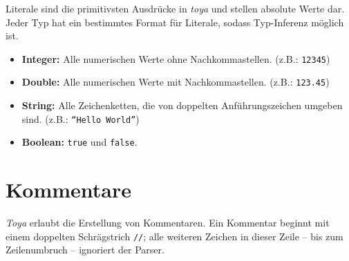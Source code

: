 Literale sind die primitivsten Ausdrücke in \textit{toya} und stellen absolute Werte dar. Jeder Typ hat ein bestimmtes Format für Literale, sodass Typ-Inferenz möglich ist. 

\begin{itemize}
    \item \textbf{Integer:} Alle numerischen Werte ohne Nachkommastellen. (z.B.: \texttt{12345})
    \item \textbf{Double:} Alle numerischen Werte mit Nachkommastellen. (z.B.: \texttt{123.45})
    \item \textbf{String:} Alle Zeichenketten, die von doppelten Anführungszeichen umgeben sind. (z.B.: \texttt{``Hello World''})
    \item \textbf{Boolean:} \texttt{true} und \texttt{false}. 
\end{itemize}

\section{Kommentare}

\textit{Toya} erlaubt die Erstellung von Kommentaren. Ein Kommentar beginnt mit einem doppelten Schrägstrich \texttt{//}; alle weiteren Zeichen in dieser Zeile -- bis zum Zeilenumbruch -- ignoriert der Parser.